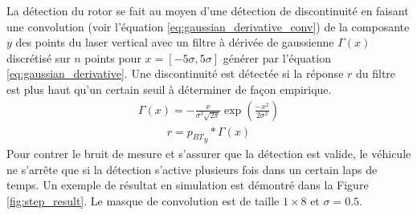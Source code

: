 La détection du rotor se fait au moyen d'une détection de discontinuité en faisant une convolution (voir l'équation \ref{eq:gaussian_derivative_conv}) de la composante $y$ des points du laser vertical avec un filtre à dérivée de gaussienne $\Gamma(x)$ discrétisé sur $n$ points pour $x=[-5\sigma,5\sigma]$ générer par l'équation \ref{eq:gaussian_derivative}. Une discontinuité est détectée si la réponse $r$ du filtre est plus haut qu'un certain seuil à déterminer de façon empirique.
\begin{align}
  \Gamma(x) = - \frac{x}{\sigma^3 \sqrt{2\pi}} \exp\left(\frac{-x^2}{2 \sigma^2}\right)
  \label{eq:gaussian_derivative}
\end{align}
\begin{align}
  r = {p_{BT}}_y * \Gamma(x)
  \label{eq:gaussian_derivative_conv}
\end{align}
Pour contrer le bruit de mesure et s'assurer que la détection est valide, le véhicule ne s'arrête que si la détection s'active plusieurs fois dans un certain laps de temps. Un exemple de résultat en simulation est démontré dans la Figure \ref{fig:step_result}. Le masque de convolution est de taille $1\times8$ et $\sigma = 0.5$.

